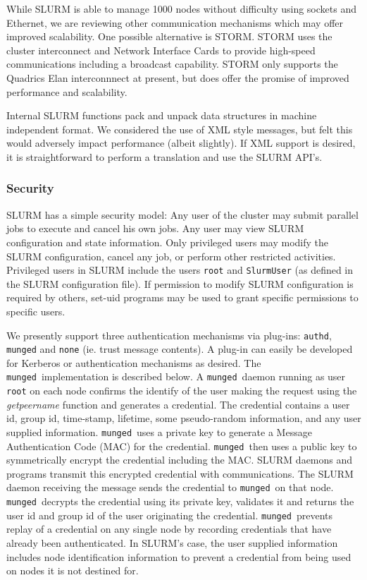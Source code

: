 \documentclass{article}
\newcommand{\munged}{{\tt munged}}
\begin{document}
While SLURM is able to manage 1000 nodes without difficulty using 
sockets and Ethernet, we are reviewing other communication 
mechanisms which may offer improved scalability. 
One possible alternative is STORM\cite{STORM2001}. 
STORM uses the cluster interconnect and Network Interface Cards to 
provide high-speed communications including a broadcast capability. 
STORM only supports the Quadrics Elan interconnnect at present, 
but does offer the promise of improved performance and scalability. 

Internal SLURM functions pack and unpack data structures in machine 
independent format. We considered the use of XML style messages, 
but felt this would adversely impact performance (albeit slightly). 
If XML support is desired, it is straightforward to perform a translation 
and use the SLURM API's.

\subsubsection{Security}

SLURM has a simple security model: 
Any user of the cluster may submit parallel jobs to execute and cancel
his own jobs.  Any user may view SLURM configuration and state
information.  
Only privileged users may modify the SLURM configuration,
cancel any job, or perform other restricted activities.  
Privileged users in SLURM include the users {\tt root} 
and {\tt SlurmUser} (as defined in the SLURM configuration file). 
If permission to modify SLURM configuration is 
required by others, set-uid programs may be used to grant specific
permissions to specific users.

We presently support three authentication mechanisms via plug-ins: 
{\tt authd}\cite{Authd2002}, {\tt munged} and {\tt none} 
(ie. trust message contents). 
A plug-in can easily be developed for Kerberos or authentication 
mechanisms as desired.
The \munged\ implementation is described below.
A \munged\ daemon running as user {\tt root} on each node confirms the 
identify of the user making the request using the {\em getpeername} 
function and generates a credential. 
The credential contains a user id, 
group id, time-stamp, lifetime, some pseudo-random information, and 
any user supplied information. \munged\ uses a private key to 
generate a Message Authentication Code (MAC) for the credential.
\munged\ then uses a public key to symmetrically encrypt 
the credential including the MAC. 
SLURM daemons and programs transmit this encrypted 
credential with communications. The SLURM daemon receiving the message 
sends the credential to \munged\ on that node. 
\munged\ decrypts the credential using its private key, validates it 
and returns the user id and group id of the user originating the 
credential.
\munged\ prevents replay of a credential on any single node 
by recording credentials that have already been authenticated.
In SLURM's case, the user supplied information includes node 
identification information to prevent a credential from being 
used on nodes it is not destined for.
\end{document}
